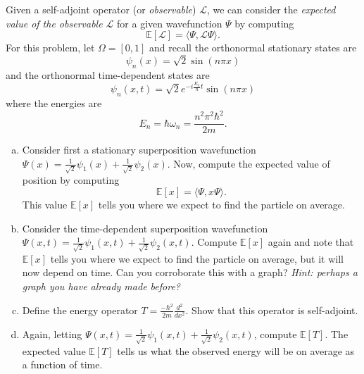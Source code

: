 \documentclass[12pt]{amsbook}
\newcommand{\innprod}[2]{\langle #1, #2\rangle}
\begin{document}
\newpage
\begin{problem}
Given a self-adjoint operator (or \emph{observable}) $\mathcal{L}$, we can consider the \emph{expected value of the observable $\mathcal{L}$} for a given wavefunction $\Psi$ by computing
   		\[
   		\mathbb{E}[\mathcal{L}]=\innprod{\Psi}{\mathcal{L}\Psi}.
   		\]
For this problem, let $\Omega = [0,1]$ and recall the orthonormal stationary states are
\[
\psi_n(x) = \sqrt{2} \sin(n\pi x)
\]
and the orthonormal time-dependent states are
\[
\psi_n(x,t) = \sqrt{2} e^{-i\frac{E_n}{\hbar}t} \sin(n \pi x)
\]
where the energies are
\[
E_n = \hbar \omega_n = \frac{n^2 \pi^2 \hbar^2}{2m}.
\]
\begin{enumerate}[(a)]
\item Consider first a stationary superposition wavefunction $\Psi(x) = \frac{1}{\sqrt{2}} \psi_1(x) + \frac{1}{\sqrt{2}} \psi_2(x)$. Now, compute the expected value of position by computing
   		\[
   		\mathbb{E}[x]=\innprod{\Psi}{x\Psi}.
   		\]
   		This value $\mathbb{E}[x]$ tells you where we expect to find the particle on average.
\item Consider the time-dependent superposition wavefunction $\Psi(x,t) = \frac{1}{\sqrt{2}} \psi_1(x,t) + \frac{1}{\sqrt{2}} \psi_2(x,t)$. Compute $\mathbb{E}[x]$ again and note that $\mathbb{E}[x]$ tells you where we expect to find the particle on average, but it will now depend on time. Can you corroborate this with a graph? \emph{Hint: perhaps a graph you have already made before?}
\item Define the energy operator $T = \frac{-\hbar^2}{2m}\frac{d^2}{dx^2}$. Show that this operator is self-adjoint.
\item Again, letting $\Psi(x,t)=\frac{1}{\sqrt{2}}\psi_1(x,t)+\frac{1}{\sqrt{2}}\psi_2(x,t)$, compute $\mathbb{E}[T]$. The expected value $\mathbb{E}[T]$ tells us what the observed energy will be on average as a function of time.
\end{enumerate}
\end{problem}
\end{document}

